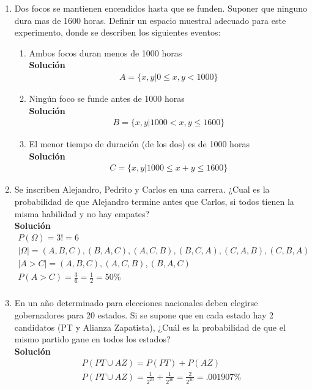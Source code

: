\begin{enumerate}
    \item Dos focos se mantienen encendidos hasta que se funden. Suponer que ninguno dura mas de 1600 		horas. Definir un espacio muestral adecuado para este experimento, donde se describen los siguientes eventos:
    \begin{enumerate}
       \item Ambos focos duran menos de 1000 horas
       \\\textbf{Solución}
        \begin{gather*}
       A = \lbrace x,y | 0\leq x,y <1000\rbrace
       \end{gather*}
      \item Ningún foco se funde antes de 1000 horas 
      \\\textbf{Solución}
      \begin{gather*}
      B = \lbrace x,y | 1000 < x,y \leq 1600\rbrace
      \end{gather*}
      \item El menor tiempo de duración (de los dos) es de 1000 horas
      \\\textbf{Solución}
      \begin{gather*}
      C = \lbrace x,y | 1000 \leq x+y \leq 1600\rbrace
      \end{gather*}
    \end{enumerate}
    \item Se inscriben Alejandro, Pedrito y Carlos en una carrera. ¿Cual es la probabilidad de que Alejandro termine antes que Carlos, si todos tienen la misma habilidad y no hay empates? 
    \\\textbf{Solución}
    \begin{gather*}
    P(\Omega) = 3! = 6\\
    |\Omega| = {(A,B,C), (B,A,C), (A,C,B), (B,C,A), (C,A,B), (C,B,A)}\\
    |A>C| = {(A,B,C), (A,C,B), (B,A,C)}\\
    P(A>C) = \frac{3}{6} =  \frac{1}{2} = 50\% \\        
    \end{gather*}
    
    \item En un año determinado para elecciones nacionales deben elegirse gobernadores para 20 estados. Si se supone que en cada estado hay 2 candidatos (PT y Alianza Zapatista), ¿Cuál es la probabilidad de que el mismo partido gane en todos los estados?
    \\\textbf{Solución}
    \begin{gather*}
    P(PT \cup AZ)= P(PT) + P(AZ)\\
    P(PT \cup AZ)= \frac{1}{2^{20}} + \frac{1}{2^{20}} = \frac{2}{2^{20}} = .001907\%\\
    \end{gather*}
    

\end{enumerate}
